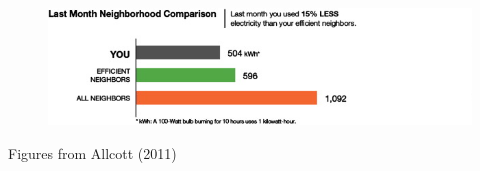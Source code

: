 \documentclass[aspectratio=169]{beamer}
\begin{document}
\begin{frame}

\begin{figure}
  \centering
  \includegraphics[width = \textwidth]{figures/energy_peers_no_emoticon}
\end{figure}

\vfill
\tiny{Figures from Allcott (2011)}

\end{frame}
\begin{frame}

\begin{figure}
  \centering
\end{figure}

\end{frame}
\end{document}

